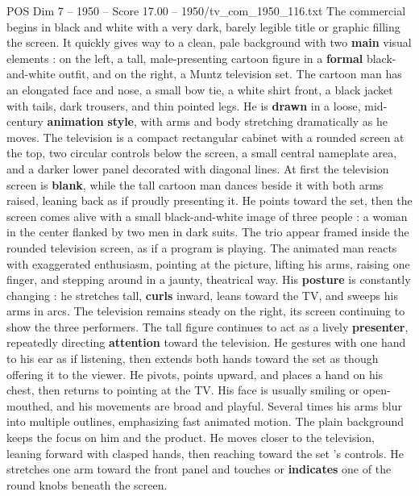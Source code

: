 \begin{textsample}{POS Dim 7 – 1950 – Score 17.00 – 1950/tv\_com\_1950\_116.txt}  \label{ex:f7_pos_007}
The commercial begins in black and white with a very dark, barely legible title or graphic filling the screen.
It quickly gives way to a clean, pale background with two \textbf{main} visual elements : on the left, a tall, male-presenting cartoon figure in a \textbf{formal} black-and-white outfit, and on the right, a Muntz television set.
The cartoon man has an elongated face and nose, a small bow tie, a white shirt front, a black jacket with tails, dark trousers, and thin pointed legs.
He is \textbf{drawn} in a loose, mid-century \textbf{animation} \textbf{style}, with arms and body stretching dramatically as he moves.
The television is a compact rectangular cabinet with a rounded screen at the top, two circular controls below the screen, a small central nameplate area, and a darker lower panel decorated with diagonal lines.
At first the television screen is \textbf{blank}, while the tall cartoon man dances beside it with both arms raised, leaning back as if proudly presenting it.
He points toward the set, then the screen comes alive with a small black-and-white image of three people : a woman in the center flanked by two men in dark suits.
The trio appear framed inside the rounded television screen, as if a program is playing.
The animated man reacts with exaggerated enthusiasm, pointing at the picture, lifting his arms, raising one finger, and stepping around in a jaunty, theatrical way.
His \textbf{posture} is constantly changing : he stretches tall, \textbf{curls} inward, leans toward the TV, and sweeps his arms in arcs.
The television remains steady on the right, its screen continuing to show the three performers.
The tall figure continues to act as a lively \textbf{presenter}, repeatedly directing \textbf{attention} toward the television.
He gestures with one hand to his ear as if listening, then extends both hands toward the set as though offering it to the viewer.
He pivots, points upward, and places a hand on his chest, then returns to pointing at the TV.
His face is usually smiling or open-mouthed, and his movements are broad and playful.
Several times his arms blur into multiple outlines, emphasizing fast animated motion.
The plain background keeps the focus on him and the product.
He moves closer to the television, leaning forward with clasped hands, then reaching toward the set ’s controls.
He stretches one arm toward the front panel and touches or \textbf{indicates} one of the round knobs beneath the screen.

\end{textsample}
